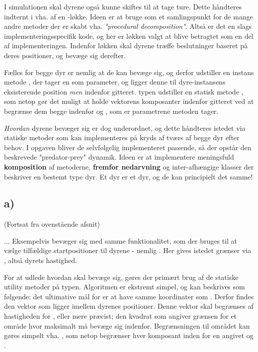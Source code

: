 I simulationen skal dyrene også kunne skiftes til at tage ture. Dette håndteres indternt i  vha. af en -løkke. Ideen er at bruge  som et samlingspunkt for de mange andre metoder der er skabt vha. \textit{"procedural decomposition"}. Altså er det en slags implementeringsspecifik kode, og her er løkken valgt at blive betragtet som en del af implementeringen. Indenfor løkken skal dyrene træffe beslutninger baseret på deres positioner, og bevæge sig derefter.

Fælles for begge dyr er nemlig at de kan bevæge sig, og derfor udstiller  en instans metode , der tager en  som parameter, og ligger denne til dyre-instansens eksisterende position \textit{men} indenfor gitteret.  typen udstiller en statisk metode , som netop gør det muligt at holde vektorens komposanter indenfor gitteret ved at begrænse dem begge indenfor  og , som er parametrene metoden tager.

\textit{Hvordan} dyrene bevæger sig er dog underordnet, og dette håndteres istedet via statiske metoder som kan implementeres på kryds af tværs af begge dyr efter behov. I opgaven bliver de selvfølgelig implementeret passende, så der opstår den beskrevede "predator-prey" dynamik. Ideen er at implementere meningsfuld \textbf{komposition} af metoderne, \textbf{fremfor nedarvning} og inter-afhængige klasser der beskriver en bestemt type dyr. Et dyr er et dyr, og de kan principielt det samme!

\subsection*{a)}

(Fortsat fra ovenstående afsnit)

... Eksempelvis bevæger  sig med samme funktionalitet, som der bruges til at vælge tilfældige startpositioner til dyrene - nemlig . Her gives istedet grænser via , altså dyrets hastighed.

For at udlede hvordan  skal bevæge sig, gøres der primært brug af de statiske utility metoder på  typen. Algoritmen er ekstremt simpel, og kan beskrives som følgende: det ultimative mål for  er at have samme koordinater som . Derfor findes den vektor som ligger imellem dyrenes positioner. Denne vektor skal begrænses af hastigheden for , eller mere præcist; den kvadrat som angiver grænsen for et område hvor  maksimalt må bevæge sig indenfor. Begrænsningen til området kan gøres simpelt vha. , som netop begrænser hver komposant inden for en angivet  og .

